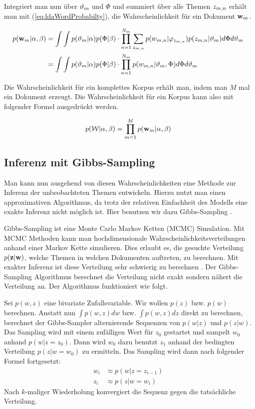 Integriert man nun über $\vartheta_{m}$ und $\Phi$ und summiert über alle Themen $z_{m,n}$ erhält man mit (\ref{eq:ldaWordProbabilty}), die Wahrscheinlichkeit für ein Dokument $\mathbf{w}_m$.

\begin{align}
p(\mathbf{w}_m|\alpha,\beta) &= \int \int p(\vartheta_{m}|\alpha)p(\Phi|\beta)\cdot \prod^{N_m}_{n=1} \sum_{z_{m,n}} p(w_{m,n}|\varphi_{z_{m,n}})p(z_{m,n}|\vartheta_{m})d\Phi d\vartheta_{m} \\ &=  \int \int p(\vartheta_{m}|\alpha)p(\Phi|\beta)\cdot \prod^{N_m}_{n=1} p(w_{m,n}|\vartheta_{m},\Phi)d\Phi d\vartheta_{m}
\label{eq:ldaDocDistribution} 
\end{align}

Die Wahrscheinlichkeit für ein komplettes Korpus erhält man, indem man $M$ mal ein Dokument erzeugt. Die Wahrscheinlichkeit für ein Korpus kann also mit folgender Formel ausgedrückt werden.

\begin{equation}
p(\mathcal{W}|\alpha,\beta) = \prod^M_{m=1} p(\mathbf{w}_m|\alpha,\beta)
\end{equation}

\subsection{Inferenz mit Gibbs-Sampling}

Man kann nun ausgehend von diesen Wahrscheinlichkeiten eine Methode zur Inferenz der unbeobachteten Themen entwickeln. Hierzu nutzt man einen approximativen Algorithmus, da trotz der relativen Einfachheit des Modells eine exakte Inferenz nicht möglich ist. Hier benutzen wir dazu Gibbs-Sampling \citep{Walsh2004} . 

Gibbs-Sampling ist eine Monte Carlo Markov Ketten (MCMC) Simulation. Mit MCMC Methoden kann man hochdimensionale  Wahrscheinlichkeitsverteilungen anhand einer Markov Kette simulieren. Dies erlaubt es, die gesuchte Verteilung $p(\mathbf{z}|\mathbf{w})$, welche Themen in welchen Dokumenten auftreten, zu berechnen. Mit exakter Inferenz ist diese Verteilung sehr schwierig zu berechnen \citep{parameterEstimation}. Der Gibbs-Sampling Algorithmus berechnet die Verteilung nicht exakt sondern nähert die Verteilung an. Der Algorithmus funktioniert wie folgt.

Sei $p(w,z)$ eine bivariate Zufallsvariable. Wir wollen $p(z)$ bzw. $p(w)$ berechnen. Anstatt nun $\int p(w,z)dw$ bzw. $\int p(w,z)dz$ direkt zu berechnen, berechnet der Gibbs-Sampler alternierende Sequenzen von $p(w|z)$ und $p(z|w)$. Das Sampling wird mit einem zufälligen Wert für $z_0$ gestartet und sampelt $w_0$ anhand $p(w|z=z_0)$. Dann wird $w_0$ dazu benutzt $z_1$ anhand der bedingten Verteilung $p(z|w=w_0)$ zu ermitteln. Das Sampling wird dann nach folgender Formel fortgesetzt:
\begin{align*}
w_i & \approx p(w|z=z_{i-1})  \\
z_i & \approx p(z|w=w_{i})
\end{align*}
Nach $k$-maliger Wiederholung konvergiert die Sequenz gegen die tatsächliche Verteilung. 

